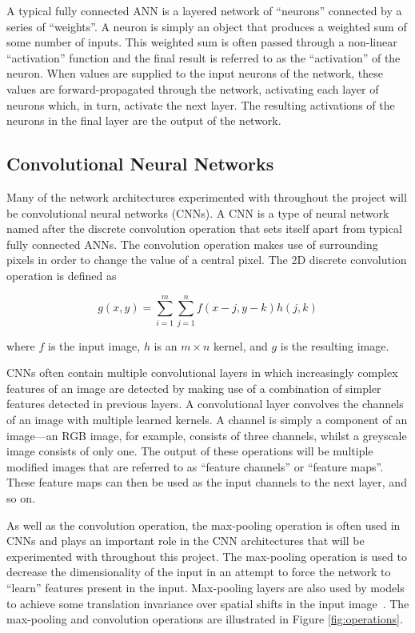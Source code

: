 A typical fully connected ANN is a layered network of ``neurons'' connected by a series of ``weights''. A neuron is simply an object that produces a weighted sum of some number of inputs. This weighted sum is often passed through a non-linear ``activation'' function and the final result is referred to as the ``activation'' of the neuron. When values are supplied to the input neurons of the network, these values are forward-propagated through the network, activating each layer of neurons which, in turn, activate the next layer. The resulting activations of the neurons in the final layer are the output of the network.

\subsection{Convolutional Neural Networks}

Many of the network architectures experimented with throughout the project will be convolutional neural networks (CNNs). A CNN is a type of neural network named after the discrete convolution operation that sets itself apart from typical fully connected ANNs. The convolution operation makes use of surrounding pixels in order to change the value of a central pixel. The 2D discrete convolution operation is defined as

\begin{equation}
    g(x,y)=\sum_{i=1}^{m}\sum_{j=1}^{n}f(x-j,y-k)h(j,k)
\end{equation}

\noindent
where $f$ is the input image, $h$ is an $m\times n$ kernel, and $g$ is the resulting image.

CNNs often contain multiple convolutional layers in which increasingly complex features of an image are detected by making use of a combination of simpler features detected in previous layers. A convolutional layer convolves the channels of an image with multiple learned kernels. A channel is simply a component of an image---an RGB image, for example, consists of three channels, whilst a greyscale image consists of only one. The output of these operations will be multiple modified images that are referred to as ``feature channels'' or ``feature maps''. These feature maps can then be used as the input channels to the next layer, and so on.

As well as the convolution operation, the max-pooling operation is often used in CNNs and plays an important role in the CNN architectures that will be experimented with throughout this project. The max-pooling operation is used to decrease the dimensionality of the input in an attempt to force the network to ``learn'' features present in the input. Max-pooling layers are also used by models to achieve some translation invariance over spatial shifts in the input image~\cite{segnet}. The max-pooling and convolution operations are illustrated in Figure \ref{fig:operations}.

